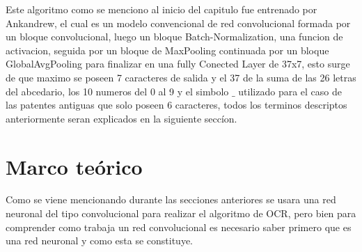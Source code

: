 Este algoritmo como se menciono al inicio del capitulo fue entrenado por Ankandrew, el cual es un modelo convencional de red convolucional
formada por un bloque convolucional, luego un bloque Batch-Normalization, una funcion de activacion, seguida por un bloque de MaxPooling
continuada por un bloque GlobalAvgPooling para finalizar en una fully Conected Layer de 37x7, esto surge de que maximo se poseen 7 caracteres
de salida y el 37 de la suma de las 26 letras del abcedario, los 10 numeros del 0 al 9 y el simbolo $\_$ utilizado para el caso de las patentes antiguas
que solo poseen 6 caracteres, todos los terminos descriptos anteriormente seran explicados en la siguiente seccíon.

\section{Marco teórico}
Como se viene mencionando durante las secciones anteriores se usara una red neuronal del tipo convolucional para realizar el algoritmo de OCR,
pero bien para comprender como trabaja un red convolucional es necesario saber primero que es una red neuronal y como esta se constituye.

